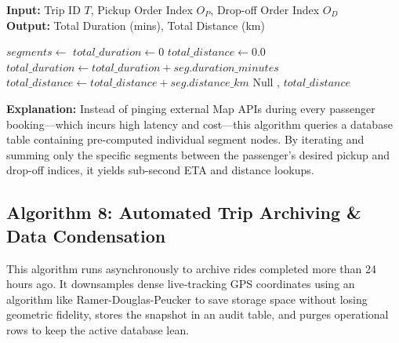 \begin{algorithm}[H]
\caption{Dynamic Route Segment ETA Calculation}
\textbf{Input:} Trip ID $T$, Pickup Order Index $O_P$, Drop-off Order Index $O_D$ \\
\textbf{Output:} Total Duration (mins), Total Distance (km)
\begin{algorithmic}[1]
    \State $segments \gets$ 
    \State $total\_duration \gets 0$
    \State $total\_distance \gets 0.0$
            \State $total\_duration \gets total\_duration + seg.duration\_minutes$
            \State $total\_distance \gets total\_distance + seg.distance\_km$
        \EndIf
    \EndFor
        \State \Return Null 
    \EndIf
    \State \Return {}, $total\_distance$
\EndFunction
\end{algorithmic}
\end{algorithm}

\textbf{Explanation:} Instead of pinging external Map APIs during every passenger booking—which incurs high latency and cost—this algorithm queries a database table containing pre-computed individual segment nodes. By iterating and summing only the specific segments between the passenger's desired pickup and drop-off indices, it yields sub-second ETA and distance lookups.

\subsection{Algorithm 8: Automated Trip Archiving \& Data Condensation}

This algorithm runs asynchronously to archive rides completed more than 24 hours ago. It downsamples dense live-tracking GPS coordinates using an algorithm like Ramer-Douglas-Peucker to save storage space without losing geometric fidelity, stores the snapshot in an audit table, and purges operational rows to keep the active database lean.

